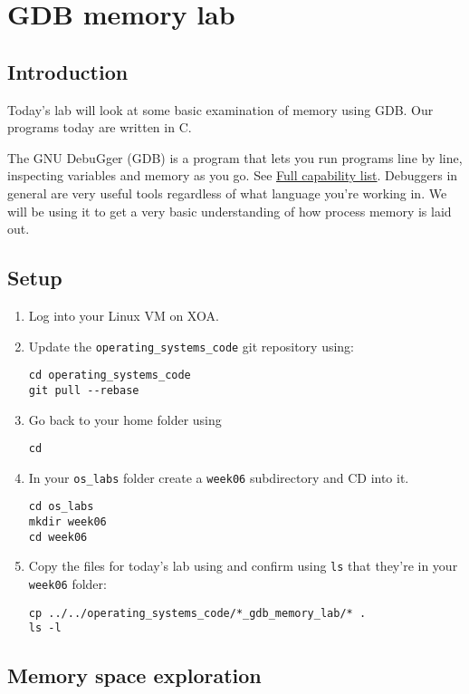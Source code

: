 \chapter{GDB memory lab}
\label{ch:gdb-memory-lab}

\section{Introduction}

Today's lab will look at some basic examination of memory using GDB.
Our programs today are written in C.

The GNU DebuGger (GDB) is a program that lets you run programs line by line, inspecting variables and memory as you go.
See \href{https://www.sourceware.org/gdb/}{Full capability list}.
Debuggers in general are very useful tools regardless of what language you're working in.
We will be using it to get a very basic understanding of how process memory is laid out.


\section{Setup}

\begin{enumerate}
\item Log into your Linux VM on XOA.
\item Update the \texttt{operating\_systems\_code} git repository using:
\begin{verbatim}
cd operating_systems_code
git pull --rebase
\end{verbatim}
\item Go back to your home folder using
\begin{verbatim}
cd
\end{verbatim}
\item In your \texttt{os\_labs} folder create a \texttt{week06} subdirectory and CD into it.
\begin{verbatim}
cd os_labs
mkdir week06
cd week06
\end{verbatim}
\item Copy the files for today's lab using and confirm using \texttt{ls} that they're in your \texttt{week06} folder:
\begin{verbatim}
cp ../../operating_systems_code/*_gdb_memory_lab/* .
ls -l
\end{verbatim}
\end{enumerate}

\section{Memory space exploration}

